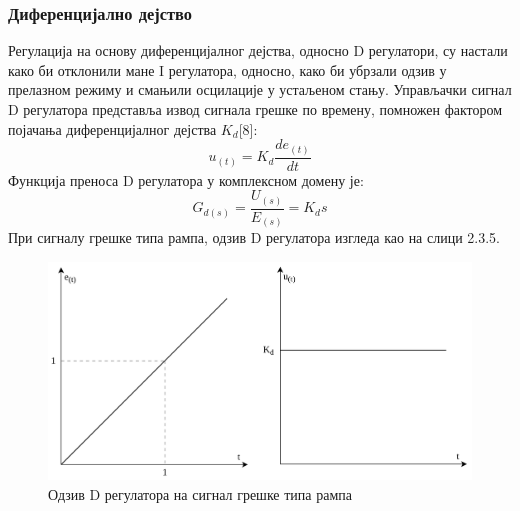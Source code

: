 \documentclass[12pt]{article}
\begin{document}
\subsubsection{Диференцијално дејство}
Регулација на основу диференцијалног дејства, односно D регулатори, су настали како би отклонили мане I регулатора, односно, како би убрзали одзив у прелазном режиму и смањили осцилације у устаљеном стању. Управљачки сигнал D регулатора представља извод сигнала грешке по времену, помножен фактором појачања диференцијалног дејства $K_d$[8]:
\begin{equation}
    u_{(t)} = K_d\dfrac{de_{(t)}}{dt}
\end{equation}
Функција преноса D регулатора у комплексном домену је:
\begin{equation}
    G_{d(s)} = \dfrac{U_{(s)}}{E_{(s)}} = K_ds
\end{equation}
При сигналу грешке типа рампа, одзив D регулатора изгледа као на слици 2.3.5.
\begin{figure}[H]
    \centering
    \includegraphics[width=13cm]{figures/d.drawio.png}
    \caption{Одзив D регулатора на сигнал грешке типа рампа}
    \label{fig:D_одзив}
\end{figure}
\end{document}
